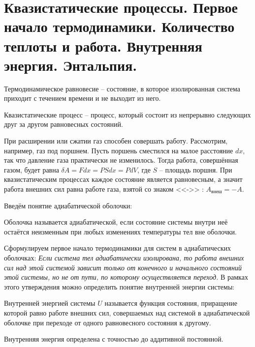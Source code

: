 \section{Квазистатические процессы. Первое начало термодинамики. Количество теплоты и работа. Внутренняя энергия. Энтальпия.}

\begin{definition}
    Термодинамическое равновесие -- состояние, в которое изолированная система приходит с течением времени и не выходит из него.
\end{definition}

\begin{definition}
    Квазистатические процесс -- процесс, который состоит из непрерывно следующих друг за другом равновесных состояний.
\end{definition}

При расширении или сжатии газ способен совершать работу. Рассмотрим, например, газ под поршнем. Пусть поршень сместился на малое расстояние $dx$, так что давление газа практически не изменилось. Тогда работа, совершённая газом, будет равна $\delta A = F dx = P S dx = P dV$, где $S$ -- площадь поршня. При квазистатическим процессах каждое состояние является равновесным, а значит работа внешних сил равна работе газа, взятой со знаком <<->> : $A_\text{внеш} = - A$.

Введём понятие адиабатической оболочки:

\begin{definition}
    Оболочка называется адиабатической, если состояние системы внутри неё остаётся неизменным при любых изменениях температуры тел вне оболочки.
\end{definition}

Сформулируем первое начало термодинамики для систем в адиабатических оболочках: \textit{Если система тел адиабатически изолирована, то работа внешних сил над этой системой зависит только от конечного и начального состояний этой системы, но не от пути, по которому осуществляется переход.} В рамках этого утверждения можно определить понятие внутренней энергии системы:

\begin{definition}
    Внутренней энергией системы $U$ называется функция состояния, приращение которой равно работе внешних сил, совершаемых над системой в адиабатической оболочке при переходе от одного равновесного состояния к другому.
\end{definition}

\begin{note}
    Внутренняя энергия определена с точностью до аддитивной постоянной.
\end{note}

